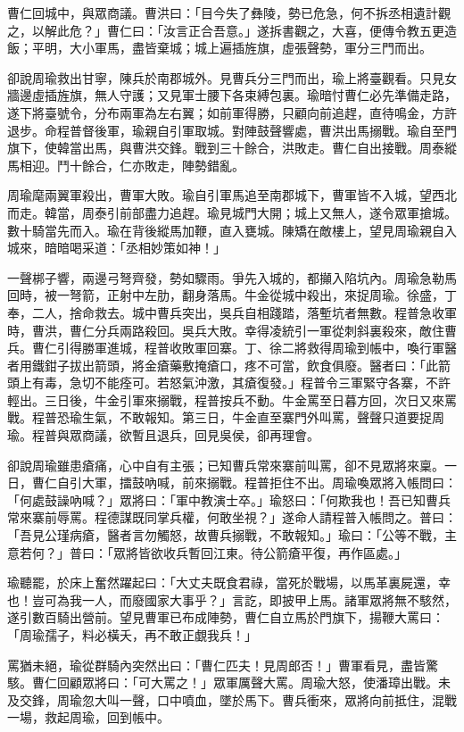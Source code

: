 曹仁回城中，與眾商議。曹洪曰：「目今失了彝陵，勢已危急，何不拆丞相遺計觀之，以解此危？」曹仁曰：「汝言正合吾意。」遂拆書觀之，大喜，便傳令教五更造飯；平明，大小軍馬，盡皆棄城；城上遍插旌旗，虛張聲勢，軍分三門而出。

卻說周瑜救出甘寧，陳兵於南郡城外。見曹兵分三門而出，瑜上將臺觀看。只見女牆邊虛插旌旗，無人守護；又見軍士腰下各束縛包裏。瑜暗忖曹仁必先準備走路，遂下將臺號令，分布兩軍為左右翼；如前軍得勝，只顧向前追趕，直待鳴金，方許退步。命程普督後軍，瑜親自引軍取城。對陣鼓聲響處，曹洪出馬搦戰。瑜自至門旗下，使韓當出馬，與曹洪交鋒。戰到三十餘合，洪敗走。曹仁自出接戰。周泰縱馬相迎。鬥十餘合，仁亦敗走，陣勢錯亂。

周瑜麾兩翼軍殺出，曹軍大敗。瑜自引軍馬追至南郡城下，曹軍皆不入城，望西北而走。韓當，周泰引前部盡力追趕。瑜見城門大開；城上又無人，遂令眾軍搶城。數十騎當先而入。瑜在背後縱馬加鞭，直入甕城。陳矯在敵樓上，望見周瑜親自入城來，暗暗喝采道：「丞相妙策如神！」

一聲梆子響，兩邊弓弩齊發，勢如驟雨。爭先入城的，都攧入陷坑內。周瑜急勒馬回時，被一弩箭，正射中左肋，翻身落馬。牛金從城中殺出，來捉周瑜。徐盛，丁奉，二人，捨命救去。城中曹兵突出，吳兵自相踐踏，落塹坑者無數。程普急收軍時，曹洪，曹仁分兵兩路殺回。吳兵大敗。幸得凌統引一軍從刺斜裏殺來，敵住曹兵。曹仁引得勝軍進城，程普收敗軍回寨。丁、徐二將救得周瑜到帳中，喚行軍醫者用鐵鉗子拔出箭頭，將金瘡藥敷掩瘡口，疼不可當，飲食俱廢。醫者曰：「此箭頭上有毒，急切不能痊可。若怒氣沖激，其瘡復發。」程普令三軍緊守各寨，不許輕出。三日後，牛金引軍來搦戰，程普按兵不動。牛金罵至日暮方回，次日又來罵戰。程普恐瑜生氣，不敢報知。第三日，牛金直至寨門外叫罵，聲聲只道要捉周瑜。程普與眾商議，欲暫且退兵，回見吳侯，卻再理會。

卻說周瑜雖患瘡痛，心中自有主張；已知曹兵常來寨前叫罵，卻不見眾將來稟。一日，曹仁自引大軍，擂鼓吶喊，前來搦戰。程普拒住不出。周瑜喚眾將入帳問曰：「何處鼓譟吶喊？」眾將曰：「軍中教演士卒。」瑜怒曰：「何欺我也！吾已知曹兵常來寨前辱罵。程德謀既同掌兵權，何敢坐視？」遂命人請程普入帳問之。普曰：「吾見公瑾病瘡，醫者言勿觸怒，故曹兵搦戰，不敢報知。」瑜曰：「公等不戰，主意若何？」普曰：「眾將皆欲收兵暫回江東。待公箭瘡平復，再作區處。」

瑜聽罷，於床上奮然躍起曰：「大丈夫既食君祿，當死於戰場，以馬革裏屍還，幸也！豈可為我一人，而廢國家大事乎？」言訖，即披甲上馬。諸軍眾將無不駭然，遂引數百騎出營前。望見曹軍已布成陣勢，曹仁自立馬於門旗下，揚鞭大罵曰：「周瑜孺子，料必橫夭，再不敢正覷我兵！」

罵猶未絕，瑜從群騎內突然出曰：「曹仁匹夫！見周郎否！」曹軍看見，盡皆驚駭。曹仁回顧眾將曰：「可大罵之！」眾軍厲聲大罵。周瑜大怒，使潘璋出戰。未及交鋒，周瑜忽大叫一聲，口中噴血，墜於馬下。曹兵衝來，眾將向前抵住，混戰一場，救起周瑜，回到帳中。

